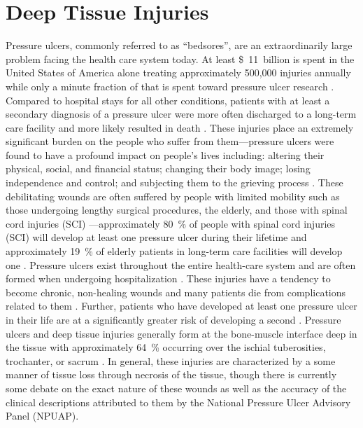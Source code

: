 	\section{Deep Tissue Injuries}
		Pressure ulcers, commonly referred to as ``bedsores'', are an extraordinarily large problem facing the health care system today. At least \SI{11}[\$]{billion} is spent in the United States of America alone treating approximately 500,000 injuries annually \cite{beckrich99,russo08} while only a minute fraction of that is spent toward pressure ulcer research \cite{zanca03}. Compared to hospital stays for all other conditions, patients with at least a secondary diagnosis of a pressure ulcer were more often discharged to a long-term care facility and more likely resulted in death \cite{russo08}. These injuries place an extremely significant burden on the people who suffer from them---pressure ulcers were found to have a profound impact on people's lives including: altering their physical, social, and financial status; changing their body image; losing independence and control; and subjecting them to the grieving process \cite{langemo00,baharestani94}. These debilitating wounds are often suffered by people with limited mobility such as those undergoing lengthy surgical procedures, the elderly, and those with spinal cord injuries (SCI) \cite{allman95}---approximately \SI{80}{\percent} of people with spinal cord injuries (SCI) will develop at least one pressure ulcer during their lifetime \cite{salzberg96} and approximately \SI{19}{\percent} of elderly patients in long-term care facilities will develop one \cite{freitas11}. Pressure ulcers exist throughout the entire health-care system and are often formed when undergoing hospitalization \cite{aronovitch99}. These injuries have a tendency to become chronic, non-healing wounds and many patients die from complications related to them \cite{jaul10}. Further, patients who have developed at least one pressure ulcer in their life are at a significantly greater risk of developing a second \cite{niazi97}. Pressure ulcers and deep tissue injuries generally form at the bone-muscle interface deep in the tissue \cite{kanno09} with approximately \SI{64}{\percent} occurring over the ischial tuberosities, trochanter, or sacrum \cite{garber03}. In general, these injuries are characterized by a some manner of tissue loss through necrosis of the tissue, though there is currently some debate on the exact nature of these wounds as well as the accuracy of the clinical descriptions attributed to them by the National Pressure Ulcer Advisory Panel (NPUAP).

